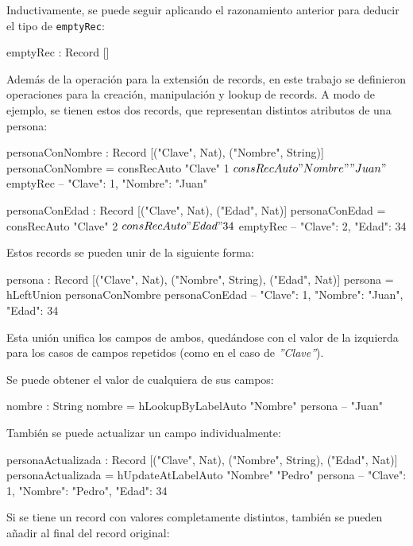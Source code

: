 Inductivamente, se puede seguir aplicando el razonamiento anterior para deducir el tipo de \texttt{emptyRec}:

\begin{code}
emptyRec : Record []
\end{code}

Además de la operación para la extensión de records, en este trabajo se definieron operaciones para la creación, manipulación y lookup de records. A modo de ejemplo, se tienen estos dos records, que representan distintos atributos de una persona:

\begin{code}
personaConNombre : Record [("Clave", Nat), ("Nombre", String)]
personaConNombre = consRecAuto "Clave" 1 $
  consRecAuto "Nombre" "Juan" $
  emptyRec
-- { "Clave": 1, "Nombre": "Juan" }

personaConEdad : Record [("Clave", Nat), ("Edad", Nat)]
personaConEdad = consRecAuto "Clave" 2 $
  consRecAuto "Edad" 34 $
  emptyRec
-- { "Clave": 2, "Edad": 34 }
\end{code}

Estos records se pueden unir de la siguiente forma:

\begin{code}
persona : Record [("Clave", Nat), ("Nombre", String),
  ("Edad", Nat)]
persona = hLeftUnion personaConNombre personaConEdad
-- { "Clave": 1, "Nombre": "Juan", "Edad": 34 }
\end{code}

Esta unión unifica los campos de ambos, quedándose con el valor de la izquierda para los casos de campos repetidos (como en el caso de \textit{''Clave''}).

Se puede obtener el valor de cualquiera de sus campos:

\begin{code}
nombre : String
nombre = hLookupByLabelAuto "Nombre" persona
-- "Juan"
\end{code}

También se puede actualizar un campo individualmente:

\begin{code}
personaActualizada : Record [("Clave", Nat), ("Nombre", String),
  ("Edad", Nat)]
personaActualizada = hUpdateAtLabelAuto "Nombre" "Pedro" persona
-- { "Clave": 1, "Nombre": "Pedro", "Edad": 34 }
\end{code}

Si se tiene un record con valores completamente distintos, también se pueden añadir al final del record original:

